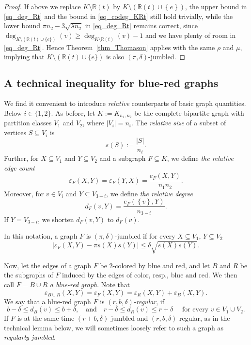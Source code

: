 \documentclass[12pt,reqno]{amsart}
\newcommand{\eps} {\varepsilon}
\newcommand{\R} {\mathbb R}
\newcommand{\Knn} {K_{n_1,n_2}}
\theoremstyle{definition}
\newcommand{\eb}{\eps_{B}}
\newcommand{\er}{\eps_{R}}
\newcommand{\ebr}{\eps_{B\cup R}}
\newcommand{\db}{d_{B}}
\newcommand{\dr}{d_{R}}
\newcommand{\rs}[1]{s(#1)}
\begin{document}
\begin{proof}
If above we replace $K \setminus \R(t)$ by $K \setminus (\R(t) \cup \left\{ e \right\})$, the upper bound in \eqref{eq_deg_Rt} and the bound in \eqref{eq_codeg_KRt} still hold trivially, while the lower bound $\pi n_2 - 3 \sqrt{\lambda n_2}$ in \eqref{eq_deg_Rt} remains correct, since $\deg_{K \setminus (\R(t) \cup \{e\})}(v) \ge \deg_{K \setminus \R(t)}(v) - 1$ and we have plenty of room in \eqref{eq_deg_Rt}. Hence Theorem~\ref{thm_Thomason} applies with the same $\rho$ and $\mu$, implying that $K \setminus (\R(t) \cup \{e\})$ is also $(\pi, \delta)$-jumbled.

\end{proof}

\subsection{A technical inequality for blue-red graphs}
\label{ss_blue_red}
We find it convenient to introduce \emph{relative} counterparts of basic graph quantities. Below $i\in\{1,2\}$. As before, let $K:= \Knn$ be the complete bipartite graph with partition classes $V_1$ and $V_2$, where $|V_i| = n_i$.
The {\em relative size} of a subset of vertices $S\subseteq V_i$ is
\[
	\rs{S} := \frac{|S|}{n_i}.
\]
Further, for $X\subseteq V_1$ and $Y\subseteq V_{2}$ and a subgraph $F \subseteq K$, we define \emph{the relative edge count}
\[
  \eps_F(X,Y) = \eps_F(Y,X) = \frac{e_F(X,Y)}{n_1n_2}.
\]
Moreover, for $v\in V_i$ and  $Y\subseteq V_{3-i}$, we define {\em the relative degree}
\[
  d_F(v,Y) = \frac{e_F(\left\{ v \right\}, Y)}{n_{3-i}}.
\]
If  $Y = V_{3-i}$, we shorten $d_F(v,Y)$ to $d_F(v)$.

In this notation, a graph $F$ is $(\pi,\delta)$-jumbled if for every $X \subseteq V_1$, $Y \subseteq V_2$
\begin{equation}
  \label{eq_quasi_rel}
	|\eps_F(X,Y) - \pi\rs{X}\rs{Y}| \le \delta \sqrt{\rs{X}\rs{Y}}.
\end{equation}

Now, let the edges of a graph $F$ be 2-colored by blue and red, and let $B$ and $R$ be the subgraphs of $F$ induced by the edges of color, resp., blue and red. We then call $F = B \cup R$ \emph{a blue-red graph}.
Note that
\[
	\ebr(X,Y) = \eps_F(X,Y)= \er(X,Y) + \eb(X,Y).
\]
We say that a blue-red graph $F$ is \emph{$(r,b,\delta)$-regular}, if
\begin{equation}
  \label{eq_delta_regular}
	b - \delta \le \db (v) \le b + \delta, \quad\text{and}\quad r - \delta \le \dr (v) \le r + \delta \quad \text{ for every } v\in V_1\cup V_2.
\end{equation}
If $F$ is at the same time $(r+b, \delta)$-jumbled and $(r,b,\delta)$-regular, as in the technical lemma below, we will sometimes loosely refer to such a graph as \emph{regularly jumbled}.
\end{document}
